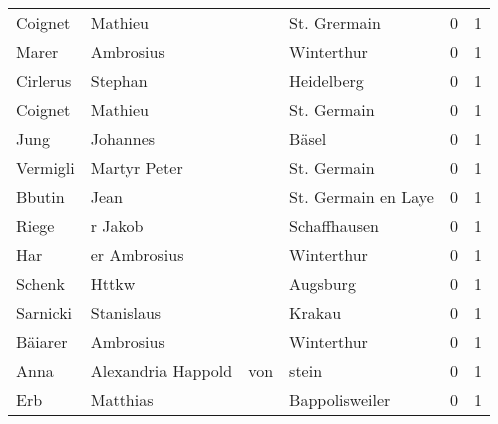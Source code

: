 \begin{center}
\begin{tiny}
\begin{longtabu}{llllrr}
                  Coignet &                            Mathieu &             &                                St. Grermain &          0 &         1 \\
                    Marer &                          Ambrosius &             &                                  Winterthur &          0 &         1 \\
                 Cirlerus &                            Stephan &             &                                  Heidelberg &          0 &         1 \\
                  Coignet &                            Mathieu &             &                                 St. Germain &          0 &         1 \\
                     Jung &                           Johannes &             &                                       Bäsel &          0 &         1 \\
                 Vermigli &                       Martyr Peter &             &                                 St. Germain &          0 &         1 \\
                   Bbutin &                               Jean &             &                         St. Germain en Laye &          0 &         1 \\
                    Riege &                            r Jakob &             &                                Schaffhausen &          0 &         1 \\
                      Har &                       er Ambrosius &             &                                  Winterthur &          0 &         1 \\
                   Schenk &                              Httkw &             &                                    Augsburg &          0 &         1 \\
                 Sarnicki &                         Stanislaus &             &                                      Krakau &          0 &         1 \\
                  Bäiarer &                          Ambrosius &             &                                  Winterthur &          0 &         1 \\
                     Anna &                Alexandria  Happold &         von &                                       stein &          0 &         1 \\
                      Erb &                           Matthias &             &                              Bappolisweiler &          0 &         1 \\

\end{longtabu}
\end{tiny}
\end{center}
